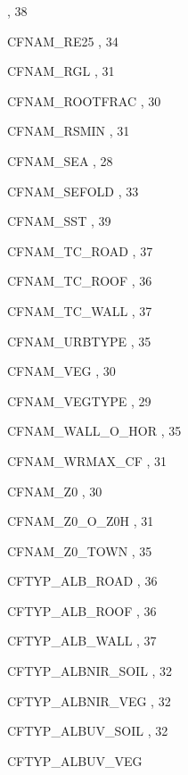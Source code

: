 \begin{theindex}
    \subitem {},  38
  \item CFNAM\_RE25
    \subitem {},  34
  \item CFNAM\_RGL
    \subitem {},  31
  \item CFNAM\_ROOTFRAC
    \subitem {},  30
  \item CFNAM\_RSMIN
    \subitem {},  31
  \item CFNAM\_SEA
    \subitem {},  28
  \item CFNAM\_SEFOLD
    \subitem {},  33
  \item CFNAM\_SST
    \subitem {},  39
  \item CFNAM\_TC\_ROAD
    \subitem {},  37
  \item CFNAM\_TC\_ROOF
    \subitem {},  36
  \item CFNAM\_TC\_WALL
    \subitem {},  37
  \item CFNAM\_URBTYPE
    \subitem {},  35
  \item CFNAM\_VEG
    \subitem {},  30
  \item CFNAM\_VEGTYPE
    \subitem {},  29
  \item CFNAM\_WALL\_O\_HOR
    \subitem {},  35
  \item CFNAM\_WRMAX\_CF
    \subitem {},  31
  \item CFNAM\_Z0
    \subitem {},  30
  \item CFNAM\_Z0\_O\_Z0H
    \subitem {},  31
  \item CFNAM\_Z0\_TOWN
    \subitem {},  35
  \item CFTYP\_ALB\_ROAD
    \subitem {},  36
  \item CFTYP\_ALB\_ROOF
    \subitem {},  36
  \item CFTYP\_ALB\_WALL
    \subitem {},  37
  \item CFTYP\_ALBNIR\_SOIL
    \subitem {},  32
  \item CFTYP\_ALBNIR\_VEG
    \subitem {},  32
  \item CFTYP\_ALBUV\_SOIL
    \subitem {},  32
  \item CFTYP\_ALBUV\_VEG

\end{theindex}
